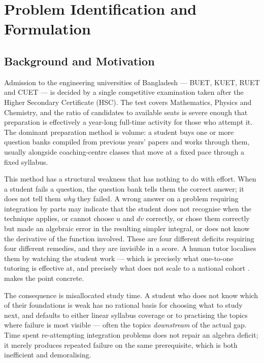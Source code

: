 \chapter{Problem Identification and Formulation}
\label{ch:problem}

\section{Background and Motivation}
\label{sec:background}

Admission to the engineering universities of Bangladesh --- BUET, KUET, RUET
and CUET --- is decided by a single competitive examination taken after the
Higher Secondary Certificate (HSC). The test covers Mathematics, Physics and
Chemistry, and the ratio of candidates to available seats is severe enough that
preparation is effectively a year-long full-time activity for those who attempt
it. The dominant preparation method is volume: a student buys one or more
question banks compiled from previous years' papers and works through them,
usually alongside coaching-centre classes that move at a fixed pace through a
fixed syllabus.

This method has a structural weakness that has nothing to do with effort. When
a student fails a question, the question bank tells them the correct answer; it
does not tell them \emph{why} they failed. A wrong answer on a problem
requiring integration by parts may indicate that the student does not recognise
when the technique applies, or cannot choose $u$ and $dv$ correctly, or chose
them correctly but made an algebraic error in the resulting simpler integral,
or does not know the derivative of the function involved. These are four
different deficits requiring four different remedies, and they are invisible in
a score. A human tutor localises them by watching the student work --- which is
precisely what one-to-one tutoring is effective at, and precisely what does not
scale to a national cohort \cite{vanlehn2011relative}. 
makes the point concrete.



The consequence is misallocated study time. A student who does not know which
of their foundations is weak has no rational basis for choosing what to study
next, and defaults to either linear syllabus coverage or to practising the
topics where failure is most visible --- often the topics \emph{downstream} of
the actual gap. Time spent re-attempting integration problems does not repair
an algebra deficit; it merely produces repeated failure on the same
prerequisite, which is both inefficient and demoralising.

